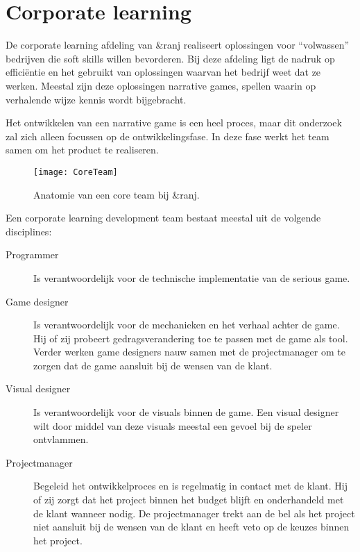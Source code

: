 \section{Corporate learning}
De corporate learning afdeling van \&ranj realiseert oplossingen voor “volwassen” bedrijven die soft skills willen bevorderen. Bij deze afdeling ligt de nadruk op efficiëntie en het gebruikt van oplossingen waarvan het bedrijf weet dat ze werken. Meestal zijn deze oplossingen narrative games, spellen waarin op verhalende wijze kennis wordt bijgebracht. 

Het ontwikkelen van een narrative game is een heel proces, maar dit onderzoek zal zich alleen focussen op de ontwikkelingsfase. In deze fase werkt het team samen om het product te realiseren.

\begin{wrapfigure}{r}{0.45\textwidth}
    \texttt{[image: CoreTeam]}
    \caption{Anatomie van een core team bij \&ranj.}
    \label{fig:coreteam}
    \centering
\end{wrapfigure}

Een corporate learning development team bestaat meestal uit de volgende disciplines:

\begin{description}
    \item[Programmer] Is verantwoordelijk voor de technische implementatie van de serious game. 
    \item[Game designer] Is verantwoordelijk voor de mechanieken en het verhaal achter de game. Hij of zij probeert gedragsverandering toe te passen met de game als tool. Verder werken game designers nauw samen met de projectmanager om te zorgen dat de game aansluit bij de wensen van de klant.
    \item[Visual designer] Is verantwoordelijk voor de visuals binnen de game. Een visual designer wilt door middel van deze visuals meestal een gevoel bij de speler ontvlammen.
    \item[Projectmanager] Begeleid het ontwikkelproces en is regelmatig in contact met de klant. Hij of zij zorgt dat het project binnen het budget blijft en onderhandeld met de klant wanneer nodig. De projectmanager trekt aan de bel als het project niet aansluit bij de wensen van de klant en heeft veto op de keuzes binnen het project.    
\end{description}

